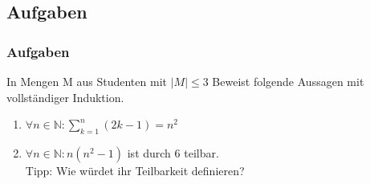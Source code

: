 \subsection{Aufgaben}
\begin{frame}
  \frametitle{Aufgaben}
  \begin{exampleblock}{In Mengen M aus Studenten mit $|M| \leq 3$}
    Beweist folgende Aussagen mit vollständiger Induktion.
    \begin{enumerate}
      \item $\forall n \in \mathbb{N}: \sum \limits^{n}_{k=1}(2k-1) = n^2$
      \item $\forall n \in \mathbb{N}: n(n^2-1)$ ist durch 6 teilbar.\\
        {\tiny Tipp: Wie würdet ihr Teilbarkeit definieren?}
    \end{enumerate}
  \end{exampleblock}
\end{frame}